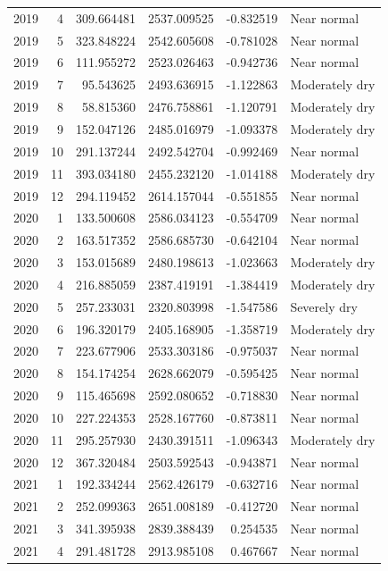 \begin{tabular}{rrrrrl}
2019 & 4 & 309.664481 & 2537.009525 & -0.832519 & Near normal \\
2019 & 5 & 323.848224 & 2542.605608 & -0.781028 & Near normal \\
2019 & 6 & 111.955272 & 2523.026463 & -0.942736 & Near normal \\
2019 & 7 & 95.543625 & 2493.636915 & -1.122863 & Moderately dry \\
2019 & 8 & 58.815360 & 2476.758861 & -1.120791 & Moderately dry \\
2019 & 9 & 152.047126 & 2485.016979 & -1.093378 & Moderately dry \\
2019 & 10 & 291.137244 & 2492.542704 & -0.992469 & Near normal \\
2019 & 11 & 393.034180 & 2455.232120 & -1.014188 & Moderately dry \\
2019 & 12 & 294.119452 & 2614.157044 & -0.551855 & Near normal \\
2020 & 1 & 133.500608 & 2586.034123 & -0.554709 & Near normal \\
2020 & 2 & 163.517352 & 2586.685730 & -0.642104 & Near normal \\
2020 & 3 & 153.015689 & 2480.198613 & -1.023663 & Moderately dry \\
2020 & 4 & 216.885059 & 2387.419191 & -1.384419 & Moderately dry \\
2020 & 5 & 257.233031 & 2320.803998 & -1.547586 & Severely dry \\
2020 & 6 & 196.320179 & 2405.168905 & -1.358719 & Moderately dry \\
2020 & 7 & 223.677906 & 2533.303186 & -0.975037 & Near normal \\
2020 & 8 & 154.174254 & 2628.662079 & -0.595425 & Near normal \\
2020 & 9 & 115.465698 & 2592.080652 & -0.718830 & Near normal \\
2020 & 10 & 227.224353 & 2528.167760 & -0.873811 & Near normal \\
2020 & 11 & 295.257930 & 2430.391511 & -1.096343 & Moderately dry \\
2020 & 12 & 367.320484 & 2503.592543 & -0.943871 & Near normal \\
2021 & 1 & 192.334244 & 2562.426179 & -0.632716 & Near normal \\
2021 & 2 & 252.099363 & 2651.008189 & -0.412720 & Near normal \\
2021 & 3 & 341.395938 & 2839.388439 & 0.254535 & Near normal \\
2021 & 4 & 291.481728 & 2913.985108 & 0.467667 & Near normal \\

\end{tabular}
